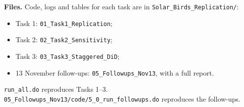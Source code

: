 \documentclass[11pt]{article}
\begin{document}
\begin{answerbox}
\textbf{Files.} Code, logs and tables for each task are in \texttt{Solar\_Birds\_Replication/}:
\begin{itemize}[leftmargin=14pt,itemsep=1pt,topsep=2pt]
\item Task 1: \texttt{01\_Task1\_Replication};
\item Task 2: \texttt{02\_Task2\_Sensitivity};
\item Task 3: \texttt{03\_Task3\_Staggered\_DiD};
\item 13 November follow-ups: \texttt{05\_Followups\_Nov13}, with a full report.
\end{itemize}
\texttt{run\_all.do} reproduces Tasks 1--3. \texttt{05\_Followups\_Nov13/code/5\_0\_run\_followups.do} reproduces the follow-ups.
\end{answerbox}
\end{document}
